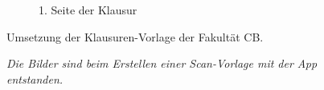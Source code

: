 \documentclass[nomenclature, oneside, 150]{HSMW-Thesis}
\begin{document}
\begin{figure}[th]
\begin{subfigure}[t]{0.4\textwidth}
        	\caption{1. Seite der Klausur}
        	\label{fig:seite2}
    	\end{subfigure}
    	\caption{Umsetzung der Klausuren-Vorlage der Fakultät CB.}
    	\caption*{\textit{Die Bilder sind beim Erstellen einer Scan-Vorlage mit der App entstanden.}}
    	\label{fig:klausur}
	\end{figure}
	
\end{document}
